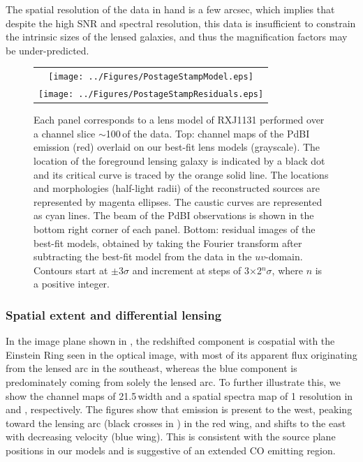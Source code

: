 \documentclass[]{emulateapj}
\begin{document}
The spatial resolution of the data in hand
is a few arcsec, which implies that despite the high SNR and spectral
resolution, this data is insufficient to constrain the
intrinsic sizes of the lensed galaxies, and thus the magnification
factors may be under-predicted. %

\begin{figure}[tbph]
\centering
\begin{tabular}{c}
\texttt{[image: ../Figures/PostageStampModel.eps]} \\
\texttt{[image: ../Figures/PostageStampResiduals.eps]}
\end{tabular}
\caption{Each panel corresponds to a lens model of RXJ1131 performed over a
channel slice $\sim$100\,\kms of the \bco data. Top: channel maps of the
PdBI \bco emission (red) overlaid on our best-fit lens models (grayscale).
The location of the foreground lensing galaxy is indicated by a black dot and
its critical curve is traced by the orange solid line. The locations and
morphologies (half-light radii) of the reconstructed sources are
represented by magenta ellipses.
The caustic curves are represented as cyan lines. The beam of the
PdBI observations is shown in the bottom right corner of each panel.
Bottom: residual images of the best-fit models, obtained by
taking the Fourier transform after subtracting the best-fit model from the
data in the $uv$-domain. Contours start
at $\pm$3$\sigma$ and increment at steps of 3$\times$2$^n\sigma$,
where $n$ is a positive integer.
\label{fig:model}}
\end{figure}

\subsubsection{Spatial extent and differential lensing} \label{sec:differential}
In the image plane shown in  , the redshifted component is 
cospatial with the Einstein Ring seen in the
optical image, with most of its apparent flux originating from the lensed arc
in the southeast, whereas the blue component is predominately coming from
solely the lensed arc. To further illustrate this, we show the
channel maps of 21.5\,\kms width and a spatial spectra map of 1 resolution in
 and , respectively. The figures
show that emission
is present to the west, peaking toward the lensing arc (black crosses in
) in the red wing, and shifts to the east with decreasing velocity
(blue wing).
This is consistent with the source plane positions in our models and 
is suggestive of an extended CO emitting region.
\end{document}
